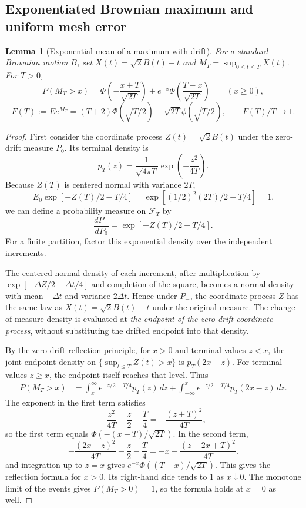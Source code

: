 \documentclass[a4paper,11pt]{article}
\newtheorem{lemma}{Lemma}[section]
\theoremstyle{remark}
\begin{document}
\subsection{Exponentiated Brownian maximum and uniform mesh error}
\begin{lemma}[Exponential mean of a maximum with drift]\label{lem:paperbrownian}
For a standard Brownian motion $B$, set $X(t)=\sqrt2B(t)-t$ and
$M_T=\sup_{0\le t\le T}X(t)$. For $T>0$,
\[
 P(M_T>x)=\Phi\!\left(-\frac{x+T}{\sqrt{2T}}\right)
 +e^{-x}\Phi\!\left(\frac{T-x}{\sqrt{2T}}\right)\qquad(x\ge0),
\]
\[
 F(T):=Ee^{M_T}=(T+2)\Phi(\sqrt{T/2})
 +\sqrt{2T}\phi(\sqrt{T/2}),\qquad F(T)/T\longrightarrow1.
\]
\end{lemma}
\begin{proof}
First consider the coordinate process $Z(t)=\sqrt2B(t)$ under the zero-drift measure $P_0$.
Its terminal density is
\[
 p_T(z)=\frac1{\sqrt{4\pi T}}\exp\!\left(-\frac{z^2}{4T}\right).
\]
Because $Z(T)$ is centered normal with variance $2T$,
\[
 E_0\exp[-Z(T)/2-T/4]
 =\exp[(1/2)^2(2T)/2-T/4]=1.
\]
we can define a probability measure on $\mathcal F_T$ by
\[
 \frac{dP_{-}}{dP_0}=\exp[-Z(T)/2-T/4].
\]
For a finite partition, factor this exponential density over the independent increments.
\par The centered normal density of each increment,
after multiplication by $\exp[-\Delta Z/2-\Delta t/4]$ and completion of the square, becomes a normal density with mean
$-\Delta t$ and variance $2\Delta t$. Hence under $P_-$, the coordinate process
$Z$ has the same law as $X(t)=\sqrt2B(t)-t$ under the original measure. The change-of-measure density is evaluated at
\emph{the endpoint of the zero-drift coordinate process}, without substituting the drifted endpoint into that density.

By the zero-drift reflection principle, for $x>0$ and terminal values $z<x$, the joint endpoint density on
$\{\sup_{t\le T}Z(t)>x\}$ is $p_T(2x-z)$.
For terminal values $z\ge x$, the endpoint itself reaches that level. Thus
\begin{align*}
 P(M_T>x)
 &=\int_x^\infty e^{-z/2-T/4}p_T(z)\,dz
 +\int_{-\infty}^x e^{-z/2-T/4}p_T(2x-z)\,dz.
\end{align*}
The exponent in the first term satisfies
\[
 -\frac{z^2}{4T}-\frac z2-\frac T4
 =-\frac{(z+T)^2}{4T},
\]
so the first term equals $\Phi(-(x+T)/\sqrt{2T})$.
In the second term,
\[
 -\frac{(2x-z)^2}{4T}-\frac z2-\frac T4
 =-x-\frac{(z-2x+T)^2}{4T}.
\]
and integration up to $z=x$ gives $e^{-x}\Phi((T-x)/\sqrt{2T})$.
This gives the reflection formula for $x>0$. Its right-hand side tends to 1 as $x\downarrow0$.
The monotone limit of the events gives $P(M_T>0)=1$, so the formula holds at $x=0$ as well.


\end{proof}
\end{document}
